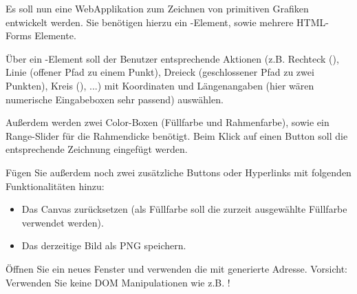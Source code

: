 %
\par Es soll nun eine WebApplikation zum Zeichnen von primitiven Grafiken
entwickelt werden. Sie benötigen hierzu ein -Element, sowie
mehrere HTML-Forms Elemente.
%
\par Über ein -Element soll der Benutzer entsprechende Aktionen
(z.B. Rechteck (), Linie (offener Pfad zu einem Punkt), Dreieck
(geschlossener Pfad zu zwei Punkten), Kreis (), ...) mit Koordinaten
und Längenangaben (hier wären numerische Eingabeboxen sehr passend) auswählen.
%
\par Außerdem werden zwei Color-Boxen (Füllfarbe und Rahmenfarbe), sowie ein
Range-Slider für die Rahmendicke benötigt. Beim Klick auf einen Button soll die
entsprechende Zeichnung eingefügt werden.
%
\par Fügen Sie außerdem noch zwei zusätzliche Buttons oder Hyperlinks mit
folgenden Funktionalitäten hinzu:
%
\begin{itemize}
\item
Das Canvas zurücksetzen (als Füllfarbe soll die zurzeit ausgewählte Füllfarbe
verwendet werden).
\item
Das derzeitige Bild als PNG speichern.
\end{itemize}
%
%
\par Öffnen Sie ein neues Fenster und verwenden die mit
 generierte Adresse. Vorsicht: Verwenden Sie keine
DOM Manipulationen wie z.B. !